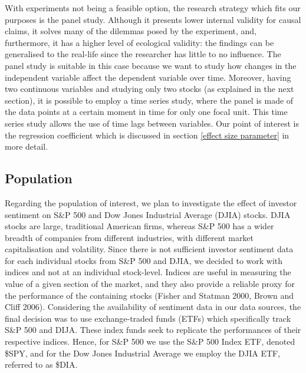 \par
With experiments not being a feasible option, the research strategy which fits our purposes is the panel study. Although it presents lower internal validity for causal claims, it solves many of the dilemmas posed by the experiment, and, furthermore, it has a higher level of ecological validity: the findings can be generalised to the real-life since the researcher has little to no influence. The panel study is suitable in this case because we want to study how changes in the independent variable affect the dependent variable over time. Moreover, having two continuous variables and studying only two stocks (as explained in the next section), it is possible to employ a time series study, where the panel is made of the data points at a certain moment in time for only one focal unit. This time series study allows the use of time lags between variables. Our point of interest is the regression coefficient which is discussed in section \ref{effect size parameter} in more detail.

\subsection{Population} \label{population}
Regarding the population of interest, we plan to investigate the effect of investor sentiment on S\&P 500 and Dow Jones Industrial Average (DJIA) stocks. DJIA stocks are large, traditional American firms, whereas S\&P 500 has a wider breadth of companies from different industries, with different market capitalisation and volatility. Since there is not sufficient investor sentiment data for each individual stocks from S\&P 500 and DJIA, we decided to work with indices and not at an individual stock-level. Indices are useful in measuring the value of a given section of the market, and they also provide a reliable proxy for the performance of the containing stocks (Fisher and Statman 2000, Brown and Cliff 2006). Considering the availability of sentiment data in our data sources, the final decision was to use exchange-traded funds (ETFs) which specifically track S\&P 500 and DIJA. These index funds seek to replicate the performances of their respective indices. Hence, for S\&P 500 we use the S\&P 500 Index ETF, denoted \$SPY, and for the Dow Jones Industrial Average we employ the DJIA ETF, referred to as \$DIA.

